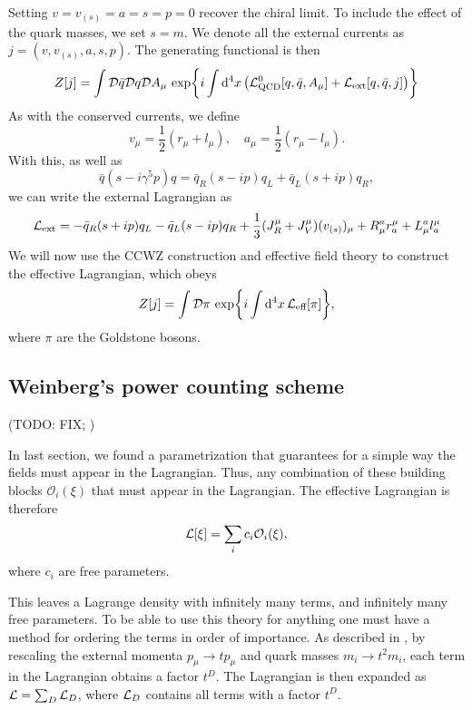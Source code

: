 Setting $v = v_{(s)} = a = s = p = 0$ recover the chiral limit.
To include the effect of the quark masses, we set $s = m$.
We denote all the external currents as $j = (v, v_{(s)}, a, s, p )$.
The generating functional is then
\begin{equation}
    Z[j] 
    = 
    \int \mathcal{D} \bar q \mathcal{D} q \mathcal{D} A_\mu \, 
    \exp{
        i \int \dd^4 x 
        \left( 
            \mathcal{L}^0_\text{QCD}[q, \bar q, A_\mu] + \mathcal{L}_\text{ext}[q, \bar q, j]
        \right)
    }
\end{equation}
As with the conserved currents, we define
\begin{equation}
    v_\mu = \frac{1}{2}(r_\mu + l_\mu),
    \quad
    a_\mu = \frac{1}{2}(r_\mu - l_\mu).
\end{equation}
With this, as well as 
\begin{equation}
    \bar q (s - i \gamma^5 p) q
    = \bar q_R (s - i p) q_L + \bar q_L (s + i p) q_R,
\end{equation}
we can write the external Lagrangian as
\begin{equation}
    \mathcal{L}_\text{ext} 
    = - \bar q_R (s + i p) q_L - \bar q_L (s - i p) q_R
    + \frac{1}{3} (J_R^\mu + J_V^\mu)(v_{(s)})_\mu
    + R_\mu^a r^\mu_a + L_\mu^a l^\mu_a
\end{equation}
We will now use the CCWZ construction and effective field theory to construct the effective Lagrangian, which obeys
\begin{equation}
    Z[j] = \int \mathcal{D} \pi \, \exp{i \int \dd^4 x \, \mathcal{L}_\text{eff}[\pi]},
\end{equation}
where $\pi$ are the Goldstone bosons.

\subsection*{Weinberg's power counting scheme}
(TODO: FIX; )


In last section, we found a parametrization that guarantees for a simple way the fields must appear in the Lagrangian.
Thus, any combination of these building blocks $\mathcal{O}_i(\xi)$ that must appear in the Lagrangian.
The effective Lagrangian is therefore
\begin{equation}
    \mathcal{L}[\xi] = \sum_i c_i \mathcal{O}_i(\xi),
\end{equation}
where $c_i$ are free parameters.

This leaves a Lagrange density with infinitely many terms, and infinitely many free parameters.
To be able to use this theory for anything one must have a method for ordering the terms in order of importance.
As described in \cite{Scherer2002IntroductionTC}, by rescaling the external momenta $p_\mu \rightarrow t p_\mu$ and quark masses $m_i \rightarrow t^2 m_i$, each term in the Lagrangian obtains a factor $t^D$.
The Lagrangian is then expanded as $\mathcal{L} = \sum_D \mathcal{L}_D$, where $\mathcal{L}_D$ contains all terms with a factor $t^D$.


